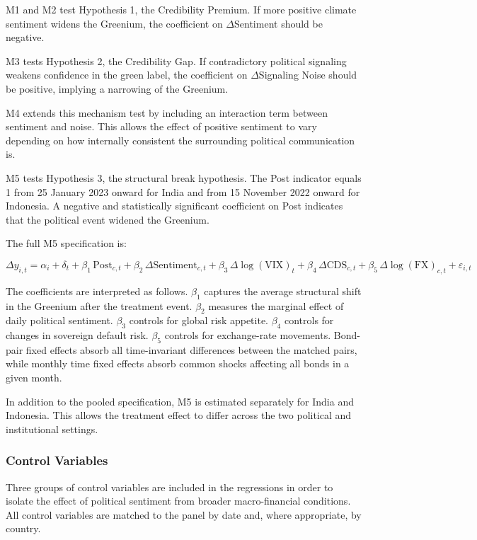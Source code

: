 \documentclass[12pt,a4paper]{article}
\begin{document}
M1 and M2 test Hypothesis 1, the Credibility Premium. If more positive climate sentiment widens the Greenium, the coefficient on $\Delta$Sentiment should be negative.

M3 tests Hypothesis 2, the Credibility Gap. If contradictory political signaling weakens confidence in the green label, the coefficient on $\Delta$Signaling Noise should be positive, implying a narrowing of the Greenium.

M4 extends this mechanism test by including an interaction term between sentiment and noise. This allows the effect of positive sentiment to vary depending on how internally consistent the surrounding political communication is.

M5 tests Hypothesis 3, the structural break hypothesis. The Post indicator equals 1 from 25 January 2023 onward for India and from 15 November 2022 onward for Indonesia. A negative and statistically significant coefficient on Post indicates that the political event widened the Greenium.

The full M5 specification is:

\begin{equation}
\Delta y_{i,t} = \alpha_i + \delta_t + \beta_1 \, \text{Post}_{c,t} + \beta_2 \, \Delta\text{Sentiment}_{c,t} + \beta_3 \, \Delta\log(\text{VIX})_t + \beta_4 \, \Delta\text{CDS}_{c,t} + \beta_5 \, \Delta\log(\text{FX})_{c,t} + \varepsilon_{i,t}
\label{eq:m5}
\end{equation}

The coefficients are interpreted as follows. $\beta_1$ captures the average structural shift in the Greenium after the treatment event. $\beta_2$ measures the marginal effect of daily political sentiment. $\beta_3$ controls for global risk appetite. $\beta_4$ controls for changes in sovereign default risk. $\beta_5$ controls for exchange-rate movements. Bond-pair fixed effects absorb all time-invariant differences between the matched pairs, while monthly time fixed effects absorb common shocks affecting all bonds in a given month.

In addition to the pooled specification, M5 is estimated separately for India and Indonesia. This allows the treatment effect to differ across the two political and institutional settings.

\subsubsection{Control Variables}

Three groups of control variables are included in the regressions in order to isolate the effect of political sentiment from broader macro-financial conditions. All control variables are matched to the panel by date and, where appropriate, by country.
\end{document}
